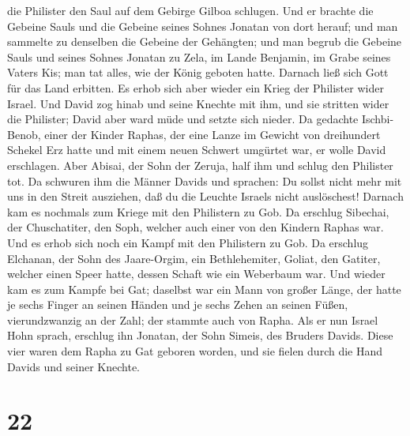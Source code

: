 die Philister den Saul auf dem Gebirge Gilboa schlugen. 
Und er brachte die Gebeine Sauls und die Gebeine seines Sohnes Jonatan
von dort herauf; und man sammelte zu denselben die Gebeine der
Gehängten;  und man begrub die Gebeine Sauls und seines
Sohnes Jonatan zu Zela, im Lande Benjamin, im Grabe seines Vaters Kis;
man tat alles, wie der König geboten hatte. Darnach ließ sich Gott für
das Land erbitten.  Es erhob sich aber wieder ein Krieg
der Philister wider Israel. Und David zog hinab und seine Knechte mit
ihm, und sie stritten wider die Philister; David aber ward müde und
setzte sich nieder. Da gedachte Ischbi-Benob,  einer der
Kinder Raphas, der eine Lanze im Gewicht von dreihundert Schekel Erz
hatte und mit einem neuen Schwert umgürtet war, er wolle David
erschlagen.  Aber Abisai, der Sohn der Zeruja, half ihm
und schlug den Philister tot. Da schwuren ihm die Männer Davids und
sprachen: Du sollst nicht mehr mit uns in den Streit ausziehen, daß du
die Leuchte Israels nicht auslöschest!  Darnach kam es
nochmals zum Kriege mit den Philistern zu Gob. Da erschlug Sibechai, der
Chuschatiter, den Soph, welcher auch einer von den Kindern Raphas war.
 Und es erhob sich noch ein Kampf mit den Philistern zu
Gob. Da erschlug Elchanan, der Sohn des Jaare-Orgim, ein Bethlehemiter,
Goliat, den Gatiter, welcher einen Speer hatte, dessen Schaft wie ein
Weberbaum war.  Und wieder kam es zum Kampfe bei Gat;
daselbst war ein Mann von großer Länge, der hatte je sechs Finger an
seinen Händen und je sechs Zehen an seinen Füßen, vierundzwanzig an der
Zahl; der stammte auch von Rapha.  Als er nun Israel Hohn
sprach, erschlug ihn Jonatan, der Sohn Simeis, des Bruders Davids.
 Diese vier waren dem Rapha zu Gat geboren worden, und
sie fielen durch die Hand Davids und seiner Knechte.

\hypertarget{section-21}{%
\section{22}\label{section-21}}

